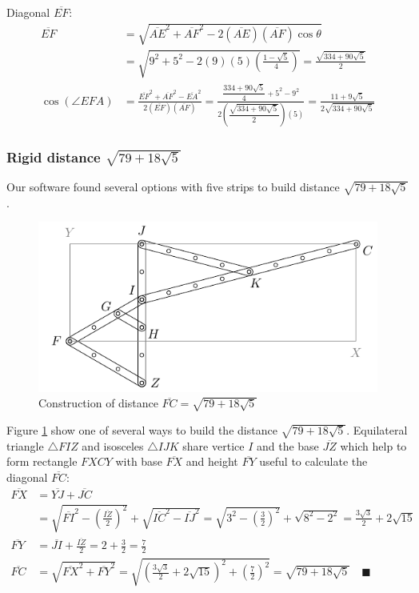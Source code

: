 \documentclass[11pt]{article}
\begin{document}
Diagonal $\overline{EF}$:
\begin{align}
\overline{EF} &= \sqrt{
 \overline{AE}^2 + \overline{AF}^2 - 2(\overline{AE})(\overline{AF})\cos\theta} \nonumber\\
 &= \sqrt{9^2 + 5^2 - 2(9)(5)\left(\frac{1-\sqrt5}4\right)} = \frac{\sqrt{334 + 90\sqrt5}}2\\
%
\cos(\angle{EFA}) &=
 \frac{\overline{EF}^2 + \overline{AF}^2 - \overline{EA}^2}{2(\overline{EF})(\overline{AF})}
 = \frac{\dfrac{334 + 90\sqrt5}4 + 5^2 - 9^2 }{2\left(\dfrac{\sqrt{334 + 90\sqrt5}}2\right)(5)}
 = \frac{11 + 9\sqrt5}{2\sqrt{334 + 90\sqrt5}}
\end{align}

\subsubsection{Rigid distance $\sqrt{79 + 18\sqrt5}$}

Our software found several options with five strips to build distance $\sqrt{79 + 18\sqrt5}$.

\begin{figure}[H]
\centering
\includegraphics[scale=1]{9/cluster9b1}
\caption{Construction of distance $\overline{FC}=\sqrt{79 + 18\sqrt5}$}
\label{fig:cluster9b1}
\end{figure}

Figure \ref{fig:cluster9b1} show one of several ways to build the distance $\sqrt{79 + 18\sqrt5}$. 
Equilateral triangle $\triangle{FIZ}$ and isosceles $\triangle{IJK}$ share vertice $I$ and the base $\overline{JZ}$ which help to form rectangle $FXCY$ with base $\overline{FX}$ and height $\overline{FY}$ useful to calculate the diagonal $\overline{FC}$:
\begin{align}
\overline{FX} &= \overline{YJ} + \overline{JC}\nonumber\\
 &= \sqrt{\overline{FI}^2 - \left(\frac{\overline{IZ}}2\right)^2}
  + \sqrt{\overline{IC}^2 - \overline{IJ}^2}
  = \sqrt{3^2 - \left(\frac{3}2\right)^2} + \sqrt{8^2 - 2^2} 
  = \frac{3\sqrt3}2 + 2\sqrt{15} \nonumber\\
\overline{FY} &= \overline{JI} + \frac{\overline{IZ}}2
  = 2 + \frac{3}2 = \frac{7}2 \nonumber\\
\overline{FC} &= \sqrt{\overline{FX}^2 + \overline{FY}^2}
 = \sqrt{\left(\frac{3\sqrt3}2 + 2\sqrt{15}\right)^2 + \left(\frac{7}2\right)^2}
 = \sqrt{79 + 18\sqrt5} \quad\blacksquare
\end{align}
\end{document}
